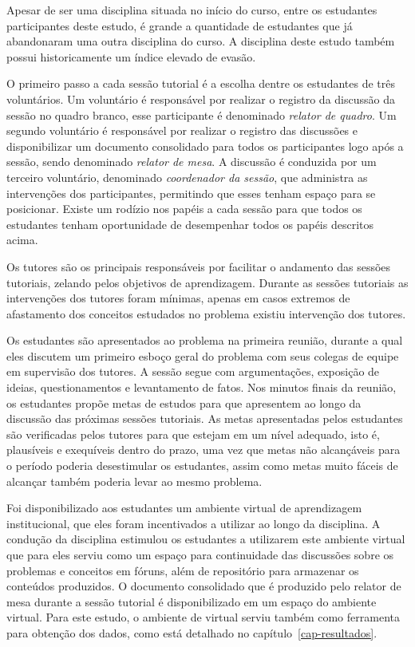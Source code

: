 Apesar de ser uma disciplina situada no início do
curso, entre os estudantes participantes deste estudo,
é grande a quantidade de estudantes que já abandonaram uma
outra disciplina do curso.
A disciplina deste estudo também possui historicamente um índice
elevado de evasão.



O primeiro passo a cada sessão tutorial é a escolha dentre os
estudantes de três voluntários.
Um voluntário é responsável por realizar o registro da discussão
da sessão no quadro branco, esse
participante é denominado \textit{relator de quadro}.
Um segundo voluntário é responsável por realizar o registro
das discussões e disponibilizar um documento consolidado para todos
os participantes logo após
a sessão, sendo denominado \textit{relator de mesa}.
A discussão é conduzida por um terceiro voluntário,
denominado \textit{coordenador da sessão}, que administra
as intervenções dos participantes, permitindo que esses
tenham espaço para se posicionar.
Existe um rodízio nos papéis a cada sessão para que todos
os estudantes tenham oportunidade de desempenhar todos
os papéis descritos acima.

Os tutores são os principais responsáveis por facilitar o andamento
das sessões tutoriais, zelando pelos objetivos de aprendizagem.
Durante as sessões tutoriais as intervenções dos tutores
foram mínimas, apenas em casos extremos de
afastamento dos conceitos estudados no problema existiu intervenção dos tutores.

Os estudantes são apresentados ao problema na primeira reunião, durante
a qual eles discutem um primeiro esboço geral do problema com seus
colegas de equipe em supervisão dos tutores.
A sessão segue com argumentações, exposição de ideias,
questionamentos e levantamento de fatos.
Nos minutos finais da reunião, os estudantes propõe metas de estudos para
que apresentem ao longo da discussão das próximas sessões tutoriais.
As metas apresentadas pelos estudantes são verificadas pelos tutores
para que estejam em um nível adequado, isto é, plausíveis e exequíveis
dentro do prazo, uma vez que metas não
alcançáveis para o período poderia desestimular os estudantes, assim
como metas muito fáceis de alcançar também poderia levar
ao mesmo problema.

Foi disponibilizado aos estudantes um ambiente virtual de aprendizagem
institucional, que eles foram incentivados a utilizar ao longo
da disciplina.
A condução da disciplina estimulou os estudantes a
utilizarem este ambiente virtual que para eles serviu como um
espaço para continuidade das discussões sobre os problemas
e conceitos em fóruns, além de repositório para armazenar
os conteúdos produzidos.
O documento consolidado que é produzido pelo relator de mesa
durante a sessão tutorial é disponibilizado em um espaço
do ambiente virtual.
Para este estudo, o ambiente de virtual serviu
também como ferramenta para obtenção dos dados,
como está detalhado no
capítulo~\ref{cap-resultados}.

